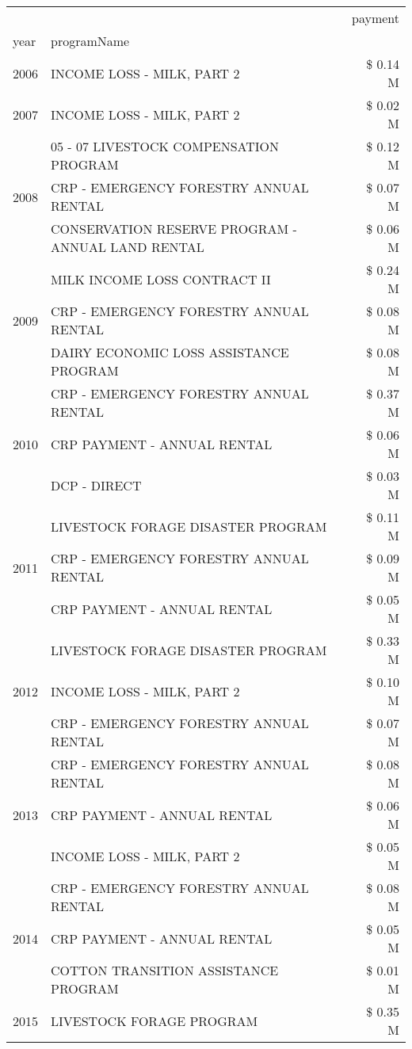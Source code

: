 \begin{tabular}{llr}
\toprule
 &  & payment \\
year & programName &  \\
\midrule
2006 & INCOME LOSS - MILK, PART 2 & \$ 0.14 M \\
\cline{1-3}
2007 & INCOME LOSS - MILK, PART 2 & \$ 0.02 M \\
\cline{1-3}
\multirow[t]{3}{*}{2008} & 05 - 07 LIVESTOCK COMPENSATION PROGRAM & \$ 0.12 M \\
 & CRP - EMERGENCY FORESTRY ANNUAL RENTAL & \$ 0.07 M \\
 & CONSERVATION RESERVE PROGRAM - ANNUAL LAND RENTAL & \$ 0.06 M \\
\cline{1-3}
\multirow[t]{3}{*}{2009} & MILK INCOME LOSS CONTRACT II & \$ 0.24 M \\
 & CRP - EMERGENCY FORESTRY ANNUAL RENTAL & \$ 0.08 M \\
 & DAIRY ECONOMIC LOSS ASSISTANCE PROGRAM & \$ 0.08 M \\
\cline{1-3}
\multirow[t]{3}{*}{2010} & CRP - EMERGENCY FORESTRY ANNUAL RENTAL & \$ 0.37 M \\
 & CRP PAYMENT - ANNUAL RENTAL & \$ 0.06 M \\
 & DCP - DIRECT & \$ 0.03 M \\
\cline{1-3}
\multirow[t]{3}{*}{2011} & LIVESTOCK FORAGE DISASTER PROGRAM & \$ 0.11 M \\
 & CRP - EMERGENCY FORESTRY ANNUAL RENTAL & \$ 0.09 M \\
 & CRP PAYMENT - ANNUAL RENTAL & \$ 0.05 M \\
\cline{1-3}
\multirow[t]{3}{*}{2012} & LIVESTOCK FORAGE DISASTER PROGRAM & \$ 0.33 M \\
 & INCOME LOSS - MILK, PART 2 & \$ 0.10 M \\
 & CRP - EMERGENCY FORESTRY ANNUAL RENTAL & \$ 0.07 M \\
\cline{1-3}
\multirow[t]{3}{*}{2013} & CRP - EMERGENCY FORESTRY ANNUAL RENTAL & \$ 0.08 M \\
 & CRP PAYMENT - ANNUAL RENTAL & \$ 0.06 M \\
 & INCOME LOSS - MILK, PART 2 & \$ 0.05 M \\
\cline{1-3}
\multirow[t]{3}{*}{2014} & CRP - EMERGENCY FORESTRY ANNUAL RENTAL & \$ 0.08 M \\
 & CRP PAYMENT - ANNUAL RENTAL & \$ 0.05 M \\
 & COTTON TRANSITION ASSISTANCE PROGRAM & \$ 0.01 M \\
\cline{1-3}
\multirow[t]{3}{*}{2015} & LIVESTOCK FORAGE PROGRAM & \$ 0.35 M \\

\end{tabular}
